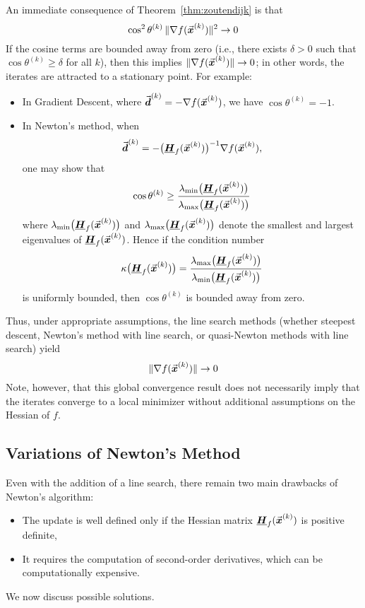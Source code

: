 An immediate consequence of Theorem~\ref{thm:zoutendijk} is that
\[
\cos^2\theta^{(k)}\, \|\nabla f(\vect{x}^{(k)})\|^2 \to 0 %
\]
If the cosine terms are bounded away from zero (i.e., there exists \(\delta > 0\) such that \(\cos\theta^{(k)} \ge \delta\) for all \(k\)), then this implies \(\|\nabla f(\vec{\boldsymbol{x}}^{(k)})\| \to 0\); in other words, the iterates are attracted to a stationary point. For example:
\begin{itemize}
  \item In Gradient Descent, where \(\vec{\boldsymbol{d}}^{(k)} = -\nabla f(\vec{\boldsymbol{x}}^{(k)})\), we have \(\cos\theta^{(k)} = -1\).
  \item In Newton's method, when 
  \[
  \vec{\boldsymbol{d}}^{(k)} = -\big(\underline{\boldsymbol{H}}_{f}(\vec{\boldsymbol{x}}^{(k)})\big)^{-1}\nabla f(\vec{\boldsymbol{x}}^{(k)}),
  \]
  one may show that
    \[
    \cos\theta^{(k)} \ge \frac{\lambda_{\min}\bigl(\matr{H}_{f}(\vect{x}^{(k)})\bigr)}{\lambda_{\max}\bigl(\matr{H}_{f}(\vect{x}^{(k)})\bigr)} %
    \]
    where \(\lambda_{\min}\bigl(\underline{\boldsymbol{H}}_{f}(\vec{\boldsymbol{x}}^{(k)})\bigr)\) and \(\lambda_{\max}\bigl(\underline{\boldsymbol{H}}_{f}(\vec{\boldsymbol{x}}^{(k)})\bigr)\) denote the smallest and largest eigenvalues of \(\underline{\boldsymbol{H}}_{f}(\vec{\boldsymbol{x}}^{(k)})\). Hence if the condition number 
    \[
    \kappa\bigl(\underline{\boldsymbol{H}}_{f}(\vec{\boldsymbol{x}}^{(k)})\bigr) = \frac{\lambda_{\max}\bigl(\underline{\boldsymbol{H}}_{f}(\vec{\boldsymbol{x}}^{(k)})\bigr)}{\lambda_{\min}\bigl(\underline{\boldsymbol{H}}_{f}(\vec{\boldsymbol{x}}^{(k)})\bigr)}
    \]
    is uniformly bounded, then \(\cos\theta^{(k)}\) is bounded away from zero.
\end{itemize}

Thus, under appropriate assumptions, the line search methods (whether steepest descent, Newton's method with line search, or quasi-Newton methods with line search) yield
\[
\|\nabla f(\vect{x}^{(k)})\| \to 0 %
\]
Note, however, that this global convergence result does not necessarily imply that the iterates converge to a local minimizer without additional assumptions on the Hessian of \(f\).


\subsection{Variations of Newton's Method}

Even with the addition of a line search, there remain two main drawbacks of Newton's algorithm:
\begin{itemize}
  \item The update is well defined only if the Hessian matrix \(\underline{\boldsymbol{H}}_{f}(\vec{\boldsymbol{x}}^{(k)})\) is positive definite,
  \item It requires the computation of second-order derivatives, which can be computationally expensive.
\end{itemize}
We now discuss possible solutions.

